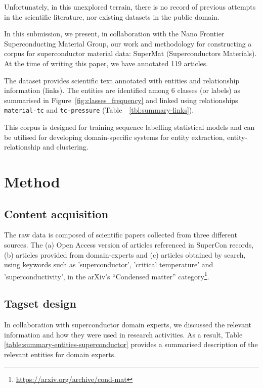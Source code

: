 \documentclass[a4paper,10pt]{article}
\begin{document}


Unfortunately, in this unexplored terrain, there is no record of previous attempts in the scientific literature, nor existing datasets in the public domain. 

In this submission, we present, in collaboration with the Nano Frontier Superconducting Material Group, our work and methodology for constructing a corpus for superconductor material data: SuperMat (Superconductors Materials). At the time of writing this paper, we have annotated 119 articles. 

The dataset provides scientific text annotated with entities and relationship information (links). The entities are identified among 6 classes (or labels) as summarised in Figure~\ref{fig:classes_frequency} and linked using relationships \texttt{material-tc} and \texttt{tc-pressure} (Table~~\ref{tbl:summary-links}). 

This corpus is designed for training sequence labelling statistical models and can be utilised for developing domain-specific systems for entity extraction, entity-relationship and clustering. 

\section{Method}
\subsection{Content acquisition}
The raw data is composed of scientific papers collected from three different sources. The (a) Open Access version of articles referenced in SuperCon records, (b) articles provided from domain-experts and (c) articles obtained by search, using keywords such as 'superconductor', 'critical temperature' and 'superconductivity', in the arXiv's “Condensed matter” category\footnote{\url{https://arxiv.org/archive/cond-mat}}.

\subsection{Tagset design}
In collaboration with superconductor domain experts, we discussed the relevant information and how they were used in research activities.
As a result, Table \ref{table:summary-entities-superconductor} provides a summarised description of the relevant entities for domain experts.
\end{document}
